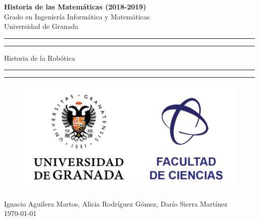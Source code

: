 \documentclass[a4paper,11pt]{article}
\begin{document}
	\begin{center}
		\large{\textbf{Historia de las Matemáticas (2018-2019)} \\ Grado en Ingeniería Informática y Matemáticas \\ Universidad de Granada }
		\vspace*{2.5cm}

		\rule{\textwidth}{1.6pt}\vspace*{-\baselineskip}\vspace*{4pt}
		\rule{\textwidth}{1.6pt}\vspace*{-\baselineskip}\vspace*{2pt}
		\vspace{0.5cm}

		\Huge{Historia de la Robótica}

		\vspace{0.5cm}
		\rule{\textwidth}{1.6pt}\vspace*{-\baselineskip}\vspace*{2pt}
		\rule{\textwidth}{1.6pt}\vspace*{-\baselineskip}\vspace*{4pt}

		\vspace{2cm}

\begin{figure}[h!]
	\centering
	\includegraphics[scale=0.5]{TeoriaDeAutomatas/img/logoUgrCiencias}
	\label{fig:logougrciencias}
\end{figure}

		\vspace{1.5cm}
		\large{Ignacio Aguilera Martos, Alicia Rodríguez Gómez, Darío Sierra Martínez \\ \today }

	\end{center}




\newpage
\end{document}
